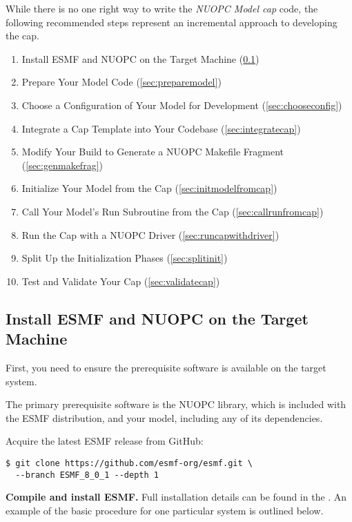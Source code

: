 
\label{sec:approach}

While there is no one right way to write the \emph{NUOPC Model cap} code, the following
recommended steps represent an incremental approach to developing the cap.
\begin{enumerate}
\item Install ESMF and NUOPC on the Target Machine (\ref{sec:installesmf})
\item Prepare Your Model Code (\ref{sec:preparemodel})
\item Choose a Configuration of Your Model for Development (\ref{sec:chooseconfig})
\item Integrate a Cap Template into Your Codebase (\ref{sec:integratecap})
\item Modify Your Build to Generate a NUOPC Makefile Fragment (\ref{sec:genmakefrag})
\item Initialize Your Model from the Cap (\ref{sec:initmodelfromcap})
\item Call Your Model's Run Subroutine from the Cap (\ref{sec:callrunfromcap})
\item Run the Cap with a NUOPC Driver (\ref{sec:runcapwithdriver})
\item Split Up the Initialization Phases (\ref{sec:splitinit})
\item Test and Validate Your Cap (\ref{sec:validatecap})
\end{enumerate}

\subsection{Install ESMF and NUOPC on the Target Machine}
\label{sec:installesmf}
First, you need to ensure the prerequisite
software is available on the target system.

The primary prerequisite software is the NUOPC library, which is
included with the ESMF distribution, and your model, including
any of its dependencies.

Acquire the latest ESMF release from GitHub:

\begin{verbatim}
$ git clone https://github.com/esmf-org/esmf.git \
  --branch ESMF_8_0_1 --depth 1
\end{verbatim}

\textbf{Compile and install ESMF.}  Full installation details can be found in the .  An example of the basic procedure
for one particular system is outlined below.

